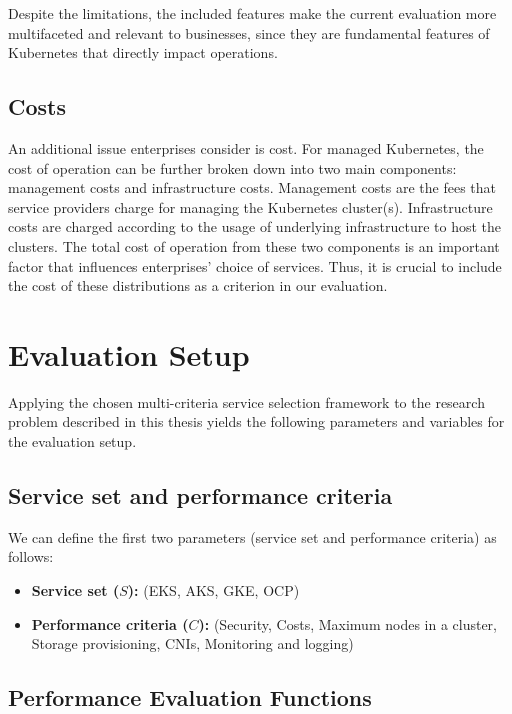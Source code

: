 Despite the limitations, the included features make the current evaluation more multifaceted and relevant to businesses, since they are fundamental features of Kubernetes that directly impact operations.

\subsection{Costs}

An additional issue enterprises consider is cost. For managed Kubernetes, the cost of operation can be further broken down into two main components: management costs and infrastructure costs. Management costs are the fees that service providers charge for managing the Kubernetes cluster(s). Infrastructure costs are charged according to the usage of underlying infrastructure to host the clusters. The total cost of operation from these two components is an important factor that influences enterprises' choice of services. Thus, it is crucial to include the cost of these distributions as a criterion in our evaluation.


\section{Evaluation Setup}\label{evaluation-setup}

Applying the chosen multi-criteria service selection framework to the research problem described in this thesis yields the following parameters and variables for the evaluation setup.

\subsection{Service set and performance
criteria}\label{service-set-and-performance-criteria}

We can define the first two parameters (service set and performance criteria) as follows:

\begin{itemize}
\tightlist
\item
  \textbf{Service set (\(S\)):} (EKS, AKS, GKE, OCP)
\item
  \textbf{Performance criteria (\(C\)):} (Security, Costs, Maximum nodes
  in a cluster, Storage provisioning, CNIs, Monitoring and logging)
\end{itemize}

\subsection{Performance Evaluation
Functions}\label{performance-evaluation-functions}

